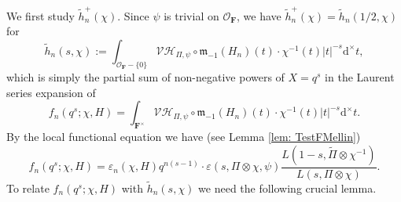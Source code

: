 \documentclass[A4]{amsart}
\numberwithin{equation}{section} \everymath{\displaystyle}
\newcommand{\ud}{\mathrm{d}}
\newcommand{\F}{\mathbf{F}}
\newcommand{\vO}{\mathcal{O}}
\newcommand{\norm}[1][\cdot]{\lvert #1 \rvert}
\newcommand{\Mult}{\mathfrak{m}}
\newcommand{\VorH}{\mathcal{VH}}
\begin{document}
	We first study $\widetilde{h}_n^+(\chi)$. Since $\psi$ is trivial on $\vO_{\F}$, we have $\widetilde{h}_n^+(\chi) = \widetilde{h}_n(1/2, \chi)$ for
\begin{equation} \label{eq: DWtFLevelnVar}
	\widetilde{h}_n(s, \chi) := \int_{\vO_{\F}-\{ 0 \}} \VorH_{\Pi,\psi} \circ \Mult_{-1}(H_n)(t) \cdot \chi^{-1}(t) \norm[t]^{-s} \ud^{\times} t,
\end{equation}
	which is simply the partial sum of non-negative powers of $X = q^s$ in the Laurent series expansion of
\begin{equation} \label{eq: DWtFLnLaurent}
	f_n(q^s; \chi,H) = \int_{\F^{\times}} \VorH_{\Pi,\psi} \circ \Mult_{-1}(H_n)(t) \cdot \chi^{-1}(t) \norm[t]^{-s} \ud^{\times} t. 
\end{equation}
	By the local functional equation we have (see Lemma \ref{lem: TestFMellin})
\begin{equation} \label{eq: DWtFLnLF}
	f_n(q^s; \chi,H) = \varepsilon_n(\chi, H) q^{n(s-1)} \cdot \varepsilon \left( s, \Pi \otimes \chi, \psi \right) \frac{L(1-s, \widetilde{\Pi} \otimes \chi^{-1})}{L(s, \Pi \otimes \chi)}.
\end{equation}
	To relate $f_n(q^s; \chi,H)$ with $\widetilde{h}_n(s, \chi)$ we need the following crucial lemma.
\end{document}
